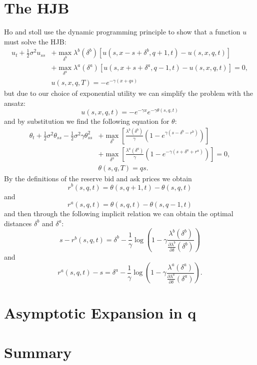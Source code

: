 \section{The HJB}
Ho and stoll use the dynamic programming principle to show that a function $u$ must solve the HJB:
\begin{align*}
    u_t + \frac{1}{2} \sigma^2u_{ss} &+ \max \limits_{ \delta^b } \lambda^b( \delta^b )[ u(s,x-s+\delta^b,q+1,t)-u(s,x,q,t)] \\
    &+\max\limits_{\delta^a}\lambda^a(\delta^a)[u(s,x+s+\delta^a,q-1,t)-u(s,x,q,t)]=0, \\
    & u(s,x,q,T) = -e^{-\gamma(x+qs)}
\end{align*}
but due to our choice of exponential utility we can simplify the problem with the ansatz:
$$u(s,x,q,t)=-e^{-\gamma x}e^{-\gamma\theta(s,q,t)}$$
and by substitution we find the following equation for $\theta:$
\begin{align*}
    \theta_t+\frac{1}{2}\sigma^2\theta_{ss}-\frac{1}{2}\sigma^2\gamma\theta_{ss}^2&+\max\limits_{\delta^b}\left[\frac{\lambda^b(\delta^b)}{\gamma}(1-e^{\gamma(s-\delta^b-r^b)})\right]\\
    &+\max\limits_{\delta^a}\left[\frac{\lambda^a(\delta^a)}{\gamma}(1-e^{-\gamma(s+\delta^a+r^a)})\right]=0,\\
    &\theta(s,q,T)=qs.
\end{align*}
By the definitions of the reserve bid and ask prices we obtain
$$r^b(s,q,t)=\theta(s,q+1,t)-\theta(s,q,t)$$
and
$$r^a(s,q,t)=\theta(s,q,t)-\theta(s,q-1,t)$$
and then through the following implicit relation we can obtain the optimal distances $\delta^b$ and $\delta^a$:
$$s-r^b(s,q,t)=\delta^b-\frac{1}{\gamma}\log\left(1-\gamma\frac{\lambda^b(\delta^b)}{\frac{\partial\lambda^b}{\partial\delta}(\delta^b)}\right)$$
and
$$r^a(s,q,t)-s=\delta^a-\frac{1}{\gamma}\log\left(1-\gamma\frac{\lambda^a(\delta^a)}{\frac{\partial\lambda^a}{\partial\delta}(\delta^a)}\right).$$

\section{Asymptotic Expansion in q}
\section{Summary}